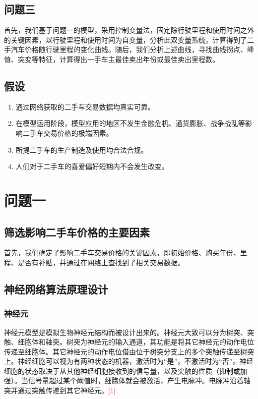 \documentclass{ctexart}
\newcounter{sub}
\begin{document}
\subsection{问题三}
首先，我们基于问题一的模型，采用控制变量法，固定除行驶里程和使用时间之外的关键因素，以行驶里程和使用时间为自变量，分析此双变量系统，计算得到了二手汽车价格随行驶里程的变化曲线。随后，我们分析上述曲线，寻找曲线拐点、峰值、突变等特征，计算得出一手车主最佳卖出年份或最佳卖出里程数。

\subsection{假设}%
\label{sub:假设}

\begin{enumerate}
	\item 通过网络获取的二手车交易数据均真实可靠。
	\item 在模型运用阶段，模型应用的地区不发生金融危机、通货膨胀、战争战乱等影响二手车交易价格的极端因素。
	\item 所提二手车的生产制造及使用均合法合规。
	\item 人们对于二手车的喜爱偏好短期内不会发生改变。
\end{enumerate}





\newpage

\section{问题一}%
\label{sec:问题一}
\subsection{筛选影响二手车价格的主要因素}
首先，我们确定了影响二手车交易价格的关键因素，即初始价格、购买年份、里程、是否有补贴，并通过在网络上查找到了相关交易数据。 %
\subsection{神经网络算法原理设计}
\subsubsection{神经元}
神经元模型是模拟生物神经元结构而被设计出来的。神经元大致可以分为树突、突触、细胞体和轴突。树突为神经元的输入通道，其功能是将其它神经元的动作电位传递至细胞体。其它神经元的动作电位借由位于树突分支上的多个突触传递至树突上。神经细胞可以视为有两种状态的机器，激活时为“是”，不激活时为“否”。神经细胞的状态取决于从其他神经细胞接收到的信号量，以及突触的性质（抑制或加强）。当信号量超过某个阈值时，细胞体就会被激活，产生电脉冲。电脉冲沿着轴突并通过突触传递到其它神经元。\textcolor{red}{[1]}
\end{document}
